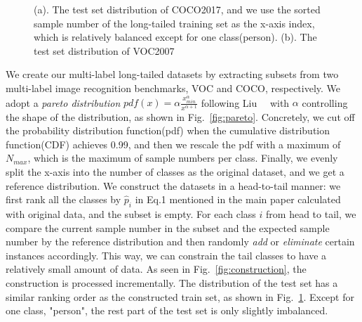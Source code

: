 \documentclass[runningheads]{llncs}
\begin{document}
\begin{figure}[t]
     \hfill
    \caption{
        (a). The test set distribution of COCO2017, and we use the sorted sample number of the long-tailed training set as the x-axis index, which is relatively balanced except for one class(person).
        (b). The test set distribution of VOC2007
    }
    \label{fig:test_dist}
\end{figure}
We create our multi-label long-tailed datasets by extracting subsets from two multi-label image recognition benchmarks, VOC and COCO, respectively.
We adopt a \textit{pareto distribution} $pdf(x) = \alpha \frac{x_{min}^\alpha}{x^{\alpha + 1}}$ following Liu~\etal~\cite{liu2019largescale} with $\alpha$ controlling the shape of the distribution, as shown in Fig.~\ref{fig:pareto}. 
Concretely, we cut off the probability distribution function(pdf) when the cumulative distribution function(CDF) achieves 0.99, and then we rescale the pdf with a maximum of $N_{max}$, which is the maximum of sample numbers per class. Finally, we evenly split the x-axis into the number of classes as the original dataset, and we get a reference distribution.
We construct the datasets in a head-to-tail manner:
we first rank all the classes by $\hat{p}_i$ in Eq.1 mentioned in the main paper calculated with original data, and the subset is empty. For each class $i$ from head to tail, we compare the current sample number in the subset and the expected sample number by the reference distribution and then randomly \textit{add} or \textit{eliminate} certain instances accordingly. 
This way, we can constrain the tail classes to have a relatively small amount of data.
As seen in Fig.~\ref{fig:construction}, the construction is processed incrementally.
The distribution of the test set has a similar ranking order as the constructed train set, as shown in Fig.~\ref{fig:test_dist}. 
Except for one class, "person", the rest part of the test set is only slightly imbalanced.
\end{document}
